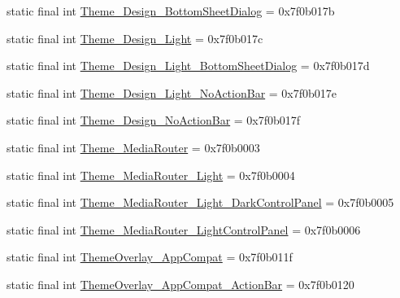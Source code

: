 \begin{CompactItemize}
\item 
static final int \hyperlink{classandroid_1_1support_1_1graphics_1_1drawable_1_1animated_1_1_r_1_1style_3ce114497119f6f464902c143ed41140}{Theme\_\-Design\_\-BottomSheetDialog} = 0x7f0b017b
\item 
static final int \hyperlink{classandroid_1_1support_1_1graphics_1_1drawable_1_1animated_1_1_r_1_1style_2c239c092e843e7467c59e0dceba62e1}{Theme\_\-Design\_\-Light} = 0x7f0b017c
\item 
static final int \hyperlink{classandroid_1_1support_1_1graphics_1_1drawable_1_1animated_1_1_r_1_1style_4e792ca3eca2ca4af8044fba0af6dfb5}{Theme\_\-Design\_\-Light\_\-BottomSheetDialog} = 0x7f0b017d
\item 
static final int \hyperlink{classandroid_1_1support_1_1graphics_1_1drawable_1_1animated_1_1_r_1_1style_f54b930db407627331c2ab424d1cd6b7}{Theme\_\-Design\_\-Light\_\-NoActionBar} = 0x7f0b017e
\item 
static final int \hyperlink{classandroid_1_1support_1_1graphics_1_1drawable_1_1animated_1_1_r_1_1style_2736dbfcd97fc84e0af49287a6f69092}{Theme\_\-Design\_\-NoActionBar} = 0x7f0b017f
\item 
static final int \hyperlink{classandroid_1_1support_1_1graphics_1_1drawable_1_1animated_1_1_r_1_1style_492928652f35adca8ef0659bce8fbb87}{Theme\_\-MediaRouter} = 0x7f0b0003
\item 
static final int \hyperlink{classandroid_1_1support_1_1graphics_1_1drawable_1_1animated_1_1_r_1_1style_bb297ed0bc68950e6973acb417aee062}{Theme\_\-MediaRouter\_\-Light} = 0x7f0b0004
\item 
static final int \hyperlink{classandroid_1_1support_1_1graphics_1_1drawable_1_1animated_1_1_r_1_1style_37137987c0f51a1ccd6e4b3eae60c144}{Theme\_\-MediaRouter\_\-Light\_\-DarkControlPanel} = 0x7f0b0005
\item 
static final int \hyperlink{classandroid_1_1support_1_1graphics_1_1drawable_1_1animated_1_1_r_1_1style_4e7eea2f194e14cac0f983ac269e87a0}{Theme\_\-MediaRouter\_\-LightControlPanel} = 0x7f0b0006
\item 
static final int \hyperlink{classandroid_1_1support_1_1graphics_1_1drawable_1_1animated_1_1_r_1_1style_5c76d4b00a8ef4b95328d9611a74cbf8}{ThemeOverlay\_\-AppCompat} = 0x7f0b011f
\item 
static final int \hyperlink{classandroid_1_1support_1_1graphics_1_1drawable_1_1animated_1_1_r_1_1style_2776baf8207b8694e94e11b72a9e45af}{ThemeOverlay\_\-AppCompat\_\-ActionBar} = 0x7f0b0120
\item 

\end{CompactItemize}
